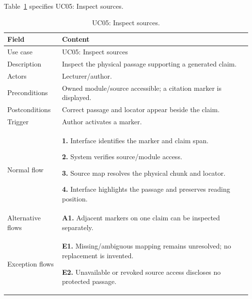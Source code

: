 \needspace{.39\textheight}
Table~\ref{tab:uc-05} specifies UC05: Inspect sources.
\begin{table}[H]\centering\footnotesize{}\renewcommand{\arraystretch}{1.05}
\caption{UC05: Inspect sources.}\label{tab:uc-05}
\begin{tabular}{|p{2.8cm}|p{11.9cm}|}\hline
\textbf{Field} & \textbf{Content}\\\hline
Use case & UC05: Inspect sources\\\hline
Description & Inspect the physical passage supporting a generated claim.\\\hline
Actors & Lecturer/author.\\\hline
Preconditions & Owned module/source accessible; a citation marker is displayed.\\\hline
Postconditions & Correct passage and locator appear beside the claim.\\\hline
Trigger & Author activates a marker.\\\hline
Normal flow & \textbf{1.} Interface identifies the marker and claim span.\par \textbf{2.} System verifies source/module access.\par \textbf{3.} Source map resolves the physical chunk and locator.\par \textbf{4.} Interface highlights the passage and preserves reading position.\\\hline
Alternative flows & \textbf{A1.} Adjacent markers on one claim can be inspected separately.\\\hline
Exception flows & \textbf{E1.} Missing/ambiguous mapping remains unresolved; no replacement is invented.\par \textbf{E2.} Unavailable or revoked source access discloses no protected passage.\\\hline
\end{tabular}\end{table}

